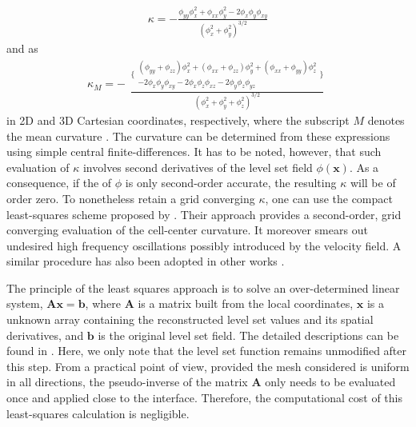 \begin{equation}
  \begin{aligned}
    \kappa =- \frac{\phi_{yy}\phi_x^2 + \phi_{xx}\phi_y^2 - 2\phi_x\phi_y\phi_{xy}}{{(\phi_x^2+\phi_y^2) }^{3/2}}
  \end{aligned}
  \label{curv 2d}
\end{equation}
and as
\begin{equation}
  \kappa_M = -
  \begin{aligned}
    \frac{\bigg\{ 
          \begin{aligned}
          (\phi_{yy}+\phi_{zz})\phi_x^2 + (\phi_{xx}+\phi_{zz})\phi_y^2  + (\phi_{xx}+\phi_{yy})\phi_z^2 \\
          - 2\phi_x\phi_y\phi_{xy} - 2\phi_x\phi_z\phi_{xz} - 2\phi_y\phi_z\phi_{yz}
          \end{aligned}
          \bigg\}
          } {{(\phi_x^2+\phi_y^2+\phi_z^2) }^{3/2}}
  \end{aligned}
  \label{curv 3d}
\end{equation}
in 2D and 3D Cartesian coordinates, respectively, where the subscript $M$ denotes the mean curvature \citep{Sethian_levelset}. The curvature can be determined from these expressions using simple central finite-differences. It has to be noted, however, that such evaluation of $\kappa$ involves second derivatives of the level set field $\phi({\bm x})$. As a consequence, if the  of $\phi$ is only second-order accurate, the resulting $\kappa$ will be of order zero. To nonetheless retain a grid converging $\kappa$, one can use the compact least-squares scheme proposed by \cite{Marchandise_JCP_2007}. Their approach provides a second-order, grid converging evaluation of the cell-center curvature. It moreover smears out undesired high frequency oscillations possibly introduced by the velocity field. A similar procedure has also been adopted in other works \citep{Desjardins_JCP_2008, Luo_JCP_2015}.

The principle of the least squares approach is to solve an over-determined linear system, $\bm {A x} = {\bm b}$, where ${\bm A}$ is a matrix built from the local coordinates, ${\bm x}$ is a unknown array containing the reconstructed level set values and its spatial derivatives, and ${\bm b}$ is the original level set field. The detailed descriptions can be found in \cite{Marchandise_JCP_2007}. Here, we only note that the level set function remains unmodified after this step. From a practical point of view, provided the mesh considered is uniform in all directions, the pseudo-inverse of the matrix ${\bm A}$ only needs to be evaluated once and applied close to the interface. Therefore, the computational cost of this least-squares calculation is negligible.

